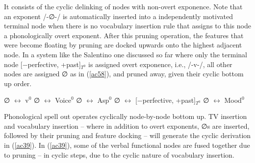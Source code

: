 \documentclass[output=paper]{langscibook}
\begin{document}
It consists of the cyclic delinking of nodes with non-overt exponence. Note that an exponent /-∅-/ is automatically  inserted  into a independently motivated  terminal node when there is no vocabulary insertion rule that assigns to this node a phonologically overt exponent.  After this pruning operation, the features that were become floating by pruning are docked upwards onto the highest adjacent node.  In a system like the Salentino one discussed so far where only the terminal node [−perfective, +past]$_{T^0}$ is assigned overt exponence, i.e., /-v-/, all other nodes are assigned ∅ as in (\ref{ac58}), and pruned away, given their cyclic bottom up order.

\ea \label{ac58}
    \ea ∅ $\longleftrightarrow$ v$^0$
    \ex ∅ $\longleftrightarrow$ Voice$^0$
    \ex ∅ $\longleftrightarrow$ Asp$^0$
    \ex ∅ $\longleftrightarrow$ [−perfective, +past]$_{T^0}$
    \ex ∅ $\longleftrightarrow$ Mood$^0$
    \z
\z

Phonological spell out operates cyclically node-by-node bottom up.  TV insertion and vocabulary insertion -- where in addition to overt exponents, ∅s are inserted, followed by their pruning and feature docking -- will generate the cyclic derivation in (\ref{ac39}). In (\ref{ac39}), some of the verbal functional nodes are fused together due to pruning  --  in cyclic steps, due to the cyclic nature of vocabulary insertion.
\end{document}
